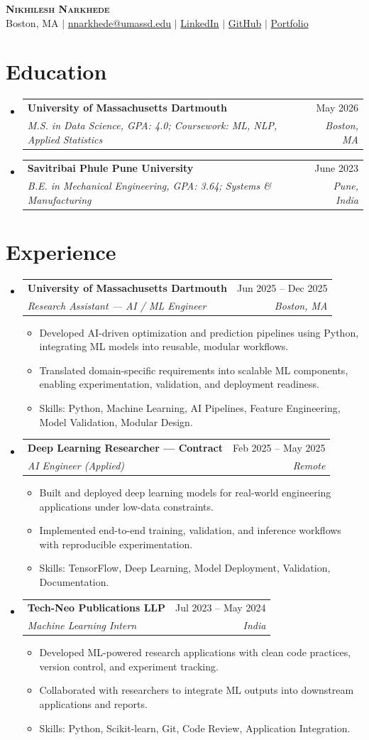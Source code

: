 \documentclass[letterpaper,11pt]{article}
\makeatletter
\newcommand{\resumeItem}[1]{\item\small{#1}}
\newcommand{\resumeSubheading}[4]{
\item
\begin{tabular*}{0.97\textwidth}{l@{\extracolsep{\fill}}r}
\textbf{#1} & #2 \\
\textit{\small #3} & \textit{\small #4}
\end{tabular*}
}
\newcommand{\resumeItemListStart}{
\begin{itemize}[leftmargin=0.15in,itemsep=1pt,topsep=2pt]
}
\newcommand{\resumeItemListEnd}{\end{itemize}}
\makeatother
\begin{document}
\begin{center}
\textbf{\Huge \scshape Nikhilesh Narkhede}\\[-2pt]
\small Boston, MA $|$
\href{mailto:nnarkhede@umassd.edu}{nnarkhede@umassd.edu} $|$
\href{https://www.linkedin.com/in/nikhileshnarkhede}{LinkedIn} $|$
\href{https://github.com/nikhileshnarkhede}{GitHub} $|$
\href{https://nikhileshnarkhede.github.io/portfolio/}{Portfolio}
\end{center}

\section{Education}
\begin{itemize}[leftmargin=0.15in,label={},itemsep=2pt]
\resumeSubheading
{University of Massachusetts Dartmouth}{May 2026}
{M.S. in Data Science, GPA: 4.0; Coursework: ML, NLP, Applied Statistics}{Boston, MA}
\resumeSubheading
{Savitribai Phule Pune University}{June 2023}
{B.E. in Mechanical Engineering, GPA: 3.64; Systems \& Manufacturing}{Pune, India}
\end{itemize}

\section{Experience}
\begin{itemize}[leftmargin=0.15in,label={}]
\resumeSubheading
{University of Massachusetts Dartmouth}{Jun 2025 -- Dec 2025}
{Research Assistant — AI / ML Engineer}{Boston, MA}
\resumeItemListStart
\resumeItem{Developed AI-driven optimization and prediction pipelines using Python, integrating ML models into reusable, modular workflows.}
\resumeItem{Translated domain-specific requirements into scalable ML components, enabling experimentation, validation, and deployment readiness.}
\resumeItem{Skills: Python, Machine Learning, AI Pipelines, Feature Engineering, Model Validation, Modular Design.}
\resumeItemListEnd
\resumeSubheading
{Deep Learning Researcher — Contract}{Feb 2025 -- May 2025}
{AI Engineer (Applied)}{Remote}
\resumeItemListStart
\resumeItem{Built and deployed deep learning models for real-world engineering applications under low-data constraints.}
\resumeItem{Implemented end-to-end training, validation, and inference workflows with reproducible experimentation.}
\resumeItem{Skills: TensorFlow, Deep Learning, Model Deployment, Validation, Documentation.}
\resumeItemListEnd
\resumeSubheading
{Tech-Neo Publications LLP}{Jul 2023 -- May 2024}
{Machine Learning Intern}{India}
\resumeItemListStart
\resumeItem{Developed ML-powered research applications with clean code practices, version control, and experiment tracking.}
\resumeItem{Collaborated with researchers to integrate ML outputs into downstream applications and reports.}
\resumeItem{Skills: Python, Scikit-learn, Git, Code Review, Application Integration.}
\resumeItemListEnd
\end{itemize}
\end{document}
